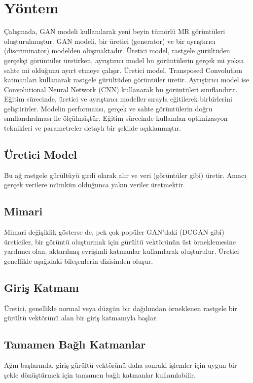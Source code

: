 \documentclass[10pt]{article}
\begin{document}
	\section{Yöntem}
	Çalışmada, GAN modeli kullanılarak yeni beyin tümörlü MR görüntüleri oluşturulmuştur. GAN modeli, bir üretici (generator) ve bir ayrıştırıcı (discriminator) modelden oluşmaktadır. Üretici model, rastgele gürültüden gerçekçi görüntüler üretirken, ayrıştırıcı model bu görüntülerin gerçek mi yoksa sahte mi olduğunu ayırt etmeye çalışır. Üretici model, Transposed Convolution katmanları kullanarak rastgele gürültüden görüntüler üretir. Ayrıştırıcı model ise Convolutional Neural Network (CNN) kullanarak bu görüntüleri sınıflandırır. Eğitim sürecinde, üretici ve ayrıştırıcı modeller sırayla eğitilerek birbirlerini geliştirirler. Modelin performansı, gerçek ve sahte görüntülerin doğru sınıflandırılması ile ölçülmüştür. Eğitim sürecinde kullanılan optimizasyon teknikleri ve parametreler detaylı bir şekilde açıklanmıştır.
	
	\subsection{Üretici Model}
	Bu ağ rastgele gürültüyü girdi olarak alır ve veri (görüntüler gibi) üretir. Amacı gerçek verilere mümkün olduğunca yakın veriler üretmektir. 
	
	\subsection{Mimari}
	Mimari değişiklik gösterse de, pek çok popüler GAN'daki (DCGAN gibi) üreticiler, bir görüntü oluşturmak için gürültü vektörünün üst örneklemesine yardımcı olan, aktarılmış evrişimli katmanlar kullanılarak oluşturulur. Üretici genellikle aşağıdaki bileşenlerin dizisinden oluşur.
	
	\subsection{Giriş Katmanı}
	Üretici, genellikle normal veya düzgün bir dağılımdan örneklenen rastgele bir gürültü vektörünü alan bir giriş katmanıyla başlar.
	
	\subsection{Tamamen Bağlı  Katmanlar}
	Ağın başlarında, giriş gürültü vektörünü daha sonraki işlemler için uygun bir şekle dönüştürmek için tamamen bağlı katmanlar kullanılabilir.
	
\end{document}

